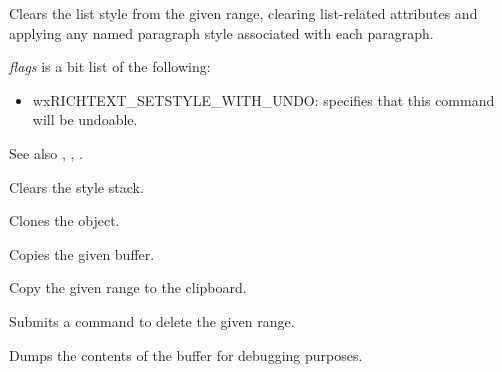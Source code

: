 Clears the list style from the given range, clearing list-related attributes and applying any named paragraph style associated with each paragraph.

{\it flags} is a bit list of the following:

\begin{itemize}\itemsep=0pt
\item wxRICHTEXT\_SETSTYLE\_WITH\_UNDO: specifies that this command will be undoable.
\end{itemize}

See also , , .

\label{wxrichtextbufferclearstylestack}


Clears the style stack.

\label{wxrichtextbufferclone}


Clones the object.

\label{wxrichtextbuffercopy}


Copies the given buffer.

\label{wxrichtextbuffercopytoclipboard}


Copy the given range to the clipboard.

\label{wxrichtextbufferdeleterangewithundo}


Submits a command to delete the given range.

\label{wxrichtextbufferdump}



Dumps the contents of the buffer for debugging purposes.

